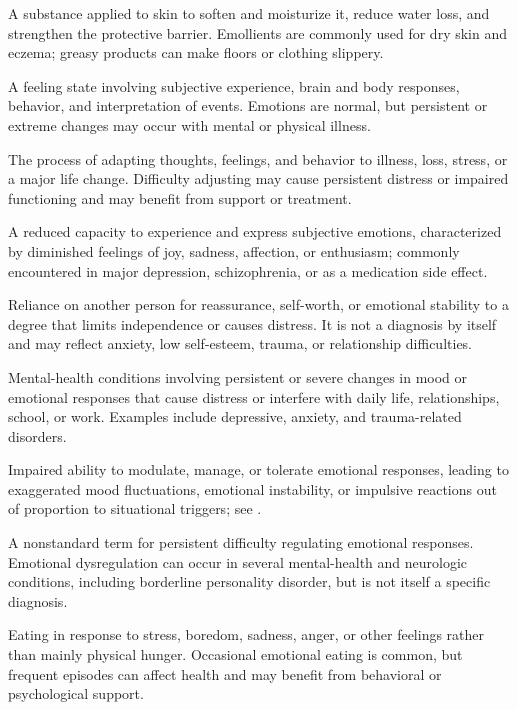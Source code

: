  A substance applied to skin to soften and moisturize it, reduce water loss, and strengthen the protective barrier. Emollients are commonly used for dry skin and eczema; greasy products can make floors or clothing slippery.

 A feeling state involving subjective experience, brain and body responses, behavior, and interpretation of events. Emotions are normal, but persistent or extreme changes may occur with mental or physical illness.

 The process of adapting thoughts, feelings, and behavior to illness, loss, stress, or a major life change. Difficulty adjusting may cause persistent distress or impaired functioning and may benefit from support or treatment.

 A reduced capacity to experience and express subjective emotions, characterized by diminished feelings of joy, sadness, affection, or enthusiasm; commonly encountered in major depression, schizophrenia, or as a medication side effect.

 Reliance on another person for reassurance, self-worth, or emotional stability to a degree that limits independence or causes distress. It is not a diagnosis by itself and may reflect anxiety, low self-esteem, trauma, or relationship difficulties.

 Mental-health conditions involving persistent or severe changes in mood or emotional responses that cause distress or interfere with daily life, relationships, school, or work. Examples include depressive, anxiety, and trauma-related disorders.

 Impaired ability to modulate, manage, or tolerate emotional responses, leading to exaggerated mood fluctuations, emotional instability, or impulsive reactions out of proportion to situational triggers; see .

 A nonstandard term for persistent difficulty regulating emotional responses. Emotional dysregulation can occur in several mental-health and neurologic conditions, including borderline personality disorder, but is not itself a specific diagnosis.

 Eating in response to stress, boredom, sadness, anger, or other feelings rather than mainly physical hunger. Occasional emotional eating is common, but frequent episodes can affect health and may benefit from behavioral or psychological support.

